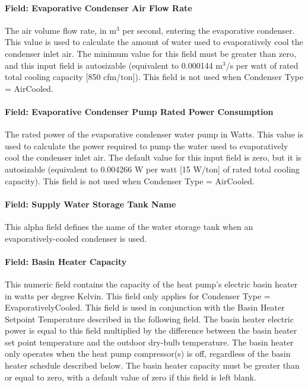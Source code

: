 \paragraph{Field: Evaporative Condenser Air Flow Rate}\label{field-evaporative-condenser-air-flow-rate-002}

The air volume flow rate, in m\(^{3}\) per second, entering the evaporative condenser. This value is used to calculate the amount of water used to evaporatively cool the condenser inlet air. The minimum value for this field must be greater than zero, and this input field is autosizable (equivalent to 0.000144 m\(^{3}\)/s per watt of rated total cooling capacity {[}850 cfm/ton{]}). This field is not used when Condenser Type = AirCooled.

\paragraph{Field: Evaporative Condenser Pump Rated Power Consumption}\label{field-evaporative-condenser-pump-rated-power-consumption-001}

The rated power of the evaporative condenser water pump in Watts. This value is used to calculate the power required to pump the water used to evaporatively cool the condenser inlet air. The default value for this input field is zero, but it is autosizable (equivalent to 0.004266 W per watt {[}15 W/ton{]} of rated total cooling capacity). This field is not used when Condenser Type = AirCooled.

\paragraph{Field: Supply Water Storage Tank Name}\label{field-supply-water-storage-tank-name-001}

This alpha field defines the name of the water storage tank when an evaporatively-cooled condenser is used.

\paragraph{Field: Basin Heater Capacity}\label{field-basin-heater-capacity-004}

This numeric field contains the capacity of the heat pump's electric basin heater in watts per degree Kelvin. This field only applies for Condenser Type = EvaporativelyCooled. This field is used in conjunction with the Basin Heater Setpoint Temperature described in the following field. The basin heater electric power is equal to this field multiplied by the difference between the basin heater set point temperature and the outdoor dry-bulb temperature. The basin heater only operates when the heat pump compressor(s) is off, regardless of the basin heater schedule described below. The basin heater capacity must be greater than or equal to zero, with a default value of zero if this field is left blank.

